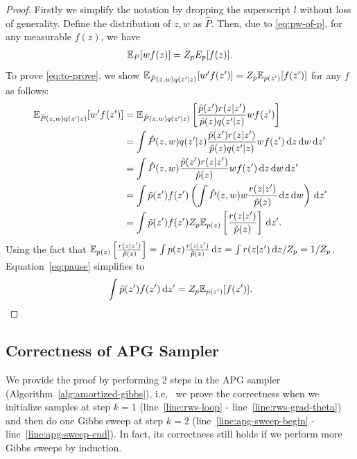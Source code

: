 \documentclass{article}
\theoremstyle{definition}
\newcommand{\given}{\lvert}
\begin{document}
\begin{proof}
    Firstly we simplify the notation by dropping the superscript $l$ without loss of generality. Define the distribution of $z, w$ as $\hat{P}$.
    Then, due to \eqref{eq:pw-of-p}, for any measurable $f(z)$, we have
    \begin{align*}
        \mathbb{E}_P[w f(z)] = Z_p E_{p}[f(z)].
    \end{align*}
    To prove \eqref{eq:to-prove}, we show $\E_{\hat{P}(z, w)q(z' \given z)}[w' f(z')] = Z_p \E_{p(z')}[f(z')]$ for any $f$ as follows:
    \begin{align}
        \E_{\hat{P}(z, w)q(z' \given z)}[w' f(z')]
        &= \E_{\hat{P}(z, w)q(z' \given z)}\left[\frac{\tilde p(z')r(z \given z')}{\tilde p(z)q(z' \given z)} w f(z')\right] 
        \nonumber\\
        &= \int \hat{P}(z, w)q(z' \given z) \frac{\tilde p(z')r(z \given z')}{\tilde p(z)q(z' \given z)} w f(z') \,\mathrm dz \,\mathrm dw \,\mathrm dz' 
        \nonumber\\
        &= \int \hat{P}(z, w) \frac{\tilde p(z')r(z \given z')}{\tilde p(z)} w f(z') \,\mathrm dz \,\mathrm dw \,\mathrm dz' 
        \nonumber\\
        &= \int \tilde p(z') f(z') \left(\int \hat{P}(z, w) w \frac{r(z \given z')}{\tilde p(z)}\,\mathrm dz \,\mathrm dw\right) \,\mathrm dz'
        \nonumber\\
        &= \int \tilde p(z') f(z') Z_p \E_{p(z)}\left[\frac{r(z \given z')}{\tilde p(z)}\right] \,\mathrm dz'. \label{eq:pause}
    \end{align}
    Using the fact that $\E_{p(z)}\left[\frac{r(z \given z')}{\tilde p(z)}\right] = \int p(z) \frac{r(z \given z')}{\tilde p(z)} \,\mathrm dz = \int r(z \given z') \,\mathrm dz / Z_p = 1 / Z_p$.
    Equation~\ref{eq:pause} simplifies to
    \begin{align*}
        \int \tilde p(z') f(z') \,\mathrm dz' = Z_p \mathbb{E}_{p(z')}[f(z')].
    \end{align*}
\end{proof}

\subsection{Correctness of APG Sampler}
We provide the proof by performing 2 steps in the APG sampler (Algorithm~\ref{alg:amortized-gibbs}), i.e,~ we prove the correctness when we initialize samples at step $k=1$ (line~\ref{line:rws-loop} - line~\ref{line:rws-grad-theta}) and then do one Gibbs sweep at step $k=2$ (line~\ref{line:apg-sweep-begin} - line~\ref{line:apg-sweep-end}). In fact, its correctness still holds if we perform more Gibbs sweeps by induction.
\end{document}
